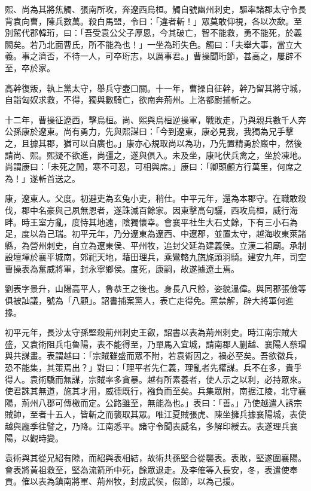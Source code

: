 \begin{pinyinscope}
熙、尚為其將焦觸、張南所攻，奔遼西烏桓。觸自號幽州刺史，驅率諸郡太守令長背袁向曹，陳兵數萬。殺白馬盟，令曰：「違者斬！」眾莫敢仰視，各以次歃。至別駕代郡韓珩，曰：「吾受袁公父子厚恩，今其破亡，智不能救，勇不能死，於義闕矣。若乃北面曹氏，所不能為也！」一坐為珩失色。觸曰：「夫舉大事，當立大義。事之濟否，不待一人，可卒珩志，以厲事君。」曹操聞珩節，甚高之，屢辟不至，卒於家。

高幹復叛，執上黨太守，舉兵守壺口關。十一年，曹操自征幹，幹乃留其將守城，自詣匈奴求救，不得，獨與數騎亡，欲南奔荊州。上洛都尉捕斬之。

十二年，曹操征遼西，擊烏桓。尚、熙與烏桓逆操軍，戰敗走，乃與親兵數千人奔公孫康於遼東。尚有勇力，先與熙謀曰：「今到遼東，康必見我，我獨為兄手擊之，且據其郡，猶可以自廣也。」康亦心規取尚以為功，乃先置精勇於廄中，然後請尚、熙。熙疑不欲進，尚彊之，遂與俱入。未及坐，康叱伏兵禽之，坐於凍地。尚謂康曰：「未死之閒，寒不可忍，可相與席。」康曰：「卿頭顱方行萬里，何席之為！」遂斬首送之。

康，遼東人。父度。初避吏為玄兔小吏，稍仕。中平元年，還為本郡守。在職敢殺伐，郡中名豪與己夙無恩者，遂誅滅百餘家。因東擊高句驪，西攻烏桓，威行海畔。時王室方亂，度恃其地遠，陰獨懷幸。會襄平社生大石丈餘，下有三小石為足，度以為己瑞。初平元年，乃分遼東為遼西、中遼郡，並置太守，越海收東萊諸縣，為營州刺史，自立為遼東侯、平州牧，追封父延為建義侯。立漢二祖廟。承制設壇墠於襄平城南，郊祀天地，藉田理兵，乘鸞輅九旒旄頭羽騎。建安九年，司空曹操表為奮威將軍，封永寧鄉侯。度死，康嗣，故遂據遼土焉。

劉表字景升，山陽高平人，魯恭王之後也。身長八尺餘，姿貌溫偉。與同郡張儉等俱被訕議，號為「八顧」。詔書捕案黨人，表亡走得免。黨禁解，辟大將軍何進掾。

初平元年，長沙太守孫堅殺荊州刺史王叡，詔書以表為荊州刺史。時江南宗賊大盛，又袁術阻兵屯魯陽，表不能得至，乃單馬入宜城，請南郡人蒯越、襄陽人蔡瑁與共謀畫。表謂越曰：「宗賊雖盛而眾不附，若袁術因之，禍必至矣。吾欲徵兵，恐不能集，其策焉出？」對曰：「理平者先仁義，理亂者先權謀。兵不在多，貴乎得人。袁術驕而無謀，宗賊率多貪暴。越有所素養者，使人示之以利，必持眾來。使君誅其無道，施其才用，威德既行，襁負而至矣。兵集眾附，南据江陵，北守襄陽，荊州八郡可傳檄而定。公路雖至，無能為也。」表曰：「善。」乃使越遣人誘宗賊帥，至者十五人，皆斬之而襲取其眾。唯江夏賊張虎、陳坐擁兵據襄陽城，表使越與龐季往譬之，乃降。江南悉平。諸守令聞表威名，多解印綬去。表遂理兵襄陽，以觀時變。

袁術與其從兄紹有隙，而紹與表相結，故術共孫堅合從襲表。表敗，堅遂圍襄陽。會表將黃祖救至，堅為流箭所中死，餘眾退走。及李傕等入長安，冬，表遣使奉貢。傕以表為鎮南將軍、荊州牧，封成武侯，假節，以為己援。


\end{pinyinscope}
